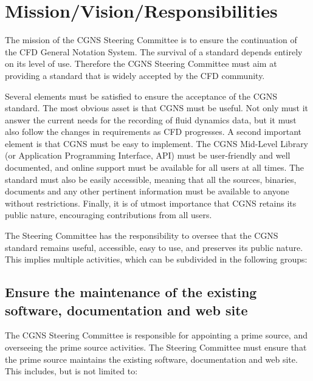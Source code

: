 \section{Mission/Vision/Responsibilities}
\label{s:mission}
\thispagestyle{plain}

The mission of the CGNS Steering Committee is to ensure the continuation
of the CFD General Notation System.
The survival of a standard depends entirely on its level of use.
Therefore the CGNS Steering Committee must aim at providing a standard
that is widely accepted by the CFD community.

Several elements must be satisfied to ensure the acceptance of the
CGNS standard.
The most obvious asset is that CGNS must be useful.
Not only must it answer the current needs for the recording of fluid
dynamics data, but it must also follow the changes in requirements as
CFD progresses.
A second important element is that CGNS must be easy to implement.
The CGNS Mid-Level Library (or
Application Programming Interface, API) must be user-friendly and
well documented, and online
support must be available for all users at all times.
The standard must also be easily accessible, meaning that all the
sources, binaries, documents and any other pertinent information must be
available to anyone without restrictions.
Finally, it is of utmost importance that CGNS retains its public nature,
encouraging contributions from all users.

The Steering Committee has the responsibility to oversee that the
CGNS standard remains useful, accessible, easy to use, and preserves
its public nature.
This implies multiple activities, which can be subdivided in the
following groups:

\subsection{Ensure the maintenance of the existing software, documentation and web site}
\label{s:maintenance}

The CGNS Steering Committee is responsible for appointing a prime
source, and overseeing the prime source activities.
The Steering Committee must ensure that the prime source maintains the
existing software, documentation and web site.
This includes, but is not limited to:

